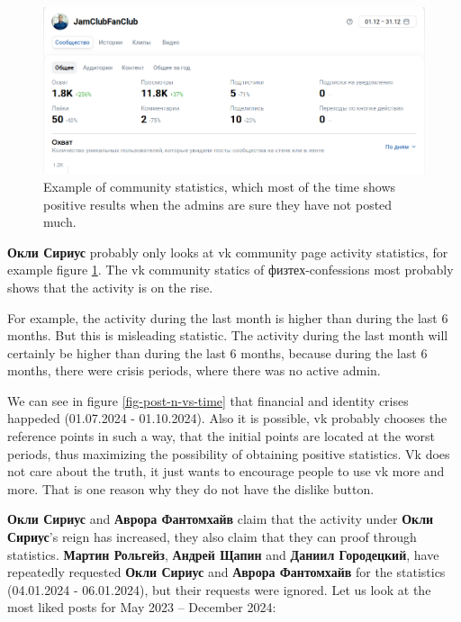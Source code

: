 \documentclass[
	12pt
] {article}
\begin{document}
	\begin{figure}[H]
		\centering
		\includegraphics[width=1\textwidth]{fig-example-of-stats-vk}
		\caption{Example of community statistics, which most of the time shows positive results when the admins are sure they have not posted much.}
		\label{fig-example-of-stats-vk}
	\end{figure}
	
	\textbf{Окли Сириус} probably only looks at vk community page activity statistics, for example figure \ref{fig-example-of-stats-vk}. The vk community statics of физтех-confessions most probably shows that the activity is on the rise. 
	
	For example, the activity during the last month is higher than during the last 6 months. But this is misleading statistic. The activity during the last month will certainly be higher than during the last 6 months, because during the last 6 months, there were crisis periods, where there was no active admin.
	
	We can see in figure \ref{fig-post-n-vs-time} that financial and identity crises happeded (01.07.2024 - 01.10.2024). Also it is possible, vk probably chooses the reference points in such a way, that the initial points are located at the worst periods, thus maximizing the possibility of obtaining positive statistics. Vk does not care about the truth, it just wants to encourage people to use vk more and more. That is one reason why they do not have the dislike button.
				
	\textbf{Окли Сириус} and \textbf{Аврора Фантомхайв} claim that the activity under \textbf{Окли Сириус}'s reign has increased, they also claim that they can proof through statistics. \textbf{Мартин Рольгейз}, \textbf{Андрей Щапин} and \textbf{Даниил Городецкий}, have repeatedly requested \textbf{Окли Сириус} and \textbf{Аврора Фантомхайв} for the statistics (04.01.2024 - 06.01.2024), but their requests were ignored. Let us look at the most liked posts for May 2023 -- December 2024:
	
\end{document}
